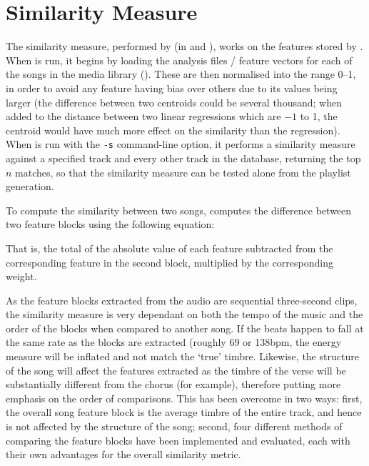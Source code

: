 \section{Similarity Measure}
\label{text:method:similarity_measure}
The similarity measure, performed by  (in  and ), works on the features stored by . When  is run, it begins by loading the analysis files / feature vectors for each of the songs in the media library (). These are then normalised into the range 0--1, in order to avoid any feature having bias over others due to its values being larger (the difference between two centroids could be several thousand; when added to the distance between two linear regressions which are $-1$ to 1, the centroid would have much more effect on the similarity than the regression). When  is run with the \texttt{-s} command-line option, it performs a similarity measure against a specified track and every other track in the database, returning the top $n$ matches, so that the similarity measure can be tested alone from the playlist generation.

To compute the similarity between two songs,  computes the difference between two feature blocks using the following equation:

That is, the total of the absolute value of each feature subtracted from the corresponding feature in the second block, multiplied by the corresponding weight.

As the feature blocks extracted from the audio are sequential three-second clips, the similarity measure is very dependant on both the tempo of the music and the order of the blocks when compared to another song. If the beats happen to fall at the same rate as the blocks are extracted (roughly 69 or 138bpm, the energy measure will be inflated and not match the `true' timbre. Likewise, the structure of the song will affect the features extracted as the timbre of the verse will be substantially different from the chorus (for example), therefore putting more emphasis on the order of comparisons. This has been overcome in two ways: first, the overall song feature block is the average timbre of the entire track, and hence is not affected by the structure of the song; second, four different methods of comparing the feature blocks have been implemented and evaluated, each with their own advantages for the overall similarity metric.

